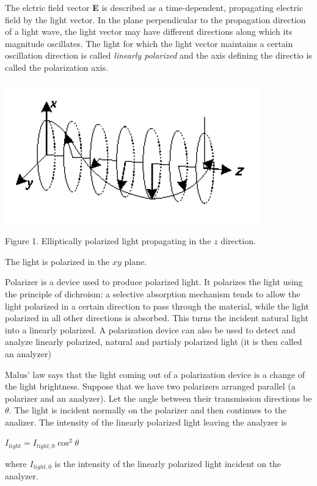 \documentclass[12pt, a4paper]{article}
\begin{document}
The elctric field vector \textbf{E} is described as a time-dependent, propagating electric field by the light vector.
In the plane perpendicular to the propagation direction of a light wave, the light vector may have different directions
along which its magnitude oscillates. The light for which the light vector maintains a certain oscillation direction is 
called \textit{linearly polarized} and the axis defining the directio is called the polarization axis.

\centerline{
	\includegraphics[scale = 0.6]{2.png}
}
\centerline{Figure 1. Elliptically polarized light propagating in the $z$ direction.} 
\centerline{The light is polarized in the $xy$ plane.}

Polarizer is a device used to produce polarized light. It polarizes the light using the principle 
of dichroism: a selective absorption mechanism tends to allow the light polarized in a certain
direction to pass through the material, while the light polarized in all other directions is absorbed. This
turns the incident natural light into a linearly polarized. A polarization device can also be used to detect and
analyze linearly polarized, natural and partialy polarized light (it is then called an analyzer)

Malus' law says that the light coming out of a polarization device is a change of the light brightness. 
Suppose that we have two polarizers arranged parallel (a polarizer and an analyzer). Let the angle between 
their transmission directions be $\theta$. The light is incident normally on the polarizer 
and then continues to the analizer. The intensity of the linearly polarized light leaving the 
analyzer is

\centerline{
	\begin{math}
		I_{light} = I_{light,0} \cos^2\theta
	\end{math}
}

\noindent where $ I_{light,0} $ is the intensity of the linearly polarized light incident 
on the analyzer.
\end{document}
